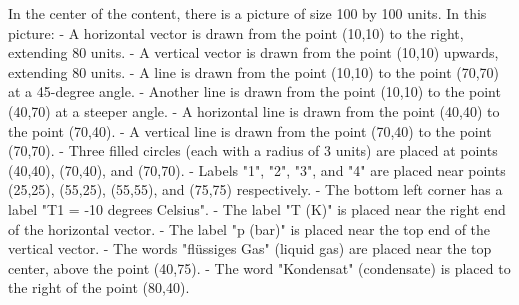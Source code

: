 In the center of the content, there is a picture of size 100 by 100 units. In this picture:
- A horizontal vector is drawn from the point (10,10) to the right, extending 80 units.
- A vertical vector is drawn from the point (10,10) upwards, extending 80 units.
- A line is drawn from the point (10,10) to the point (70,70) at a 45-degree angle.
- Another line is drawn from the point (10,10) to the point (40,70) at a steeper angle.
- A horizontal line is drawn from the point (40,40) to the point (70,40).
- A vertical line is drawn from the point (70,40) to the point (70,70).
- Three filled circles (each with a radius of 3 units) are placed at points (40,40), (70,40), and (70,70).
- Labels "1", "2", "3", and "4" are placed near points (25,25), (55,25), (55,55), and (75,75) respectively.
- The bottom left corner has a label "T1 = -10 degrees Celsius".
- The label "T (K)" is placed near the right end of the horizontal vector.
- The label "p (bar)" is placed near the top end of the vertical vector.
- The words "flüssiges Gas" (liquid gas) are placed near the top center, above the point (40,75).
- The word "Kondensat" (condensate) is placed to the right of the point (80,40).